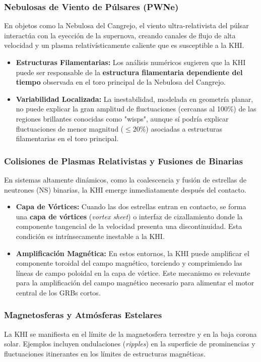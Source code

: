 \subsubsection{Nebulosas de Viento de Púlsares (PWNe)}
En objetos como la Nebulosa del Cangrejo, el viento ultra-relativista del púlsar interactúa con la eyección de la supernova, creando canales de flujo de alta velocidad y un plasma relativísticamente caliente que es susceptible a la KHI.
\begin{itemize}
    \item \textbf{Estructuras Filamentarias:} Los análisis numéricos sugieren que la KHI puede ser responsable de la \textbf{estructura filamentaria dependiente del tiempo} observada en el toro principal de la Nebulosa del Cangrejo.
    \item \textbf{Variabilidad Localizada:} La inestabilidad, modelada en geometría planar, no puede explicar la gran amplitud de fluctuaciones (cercanas al 100\%) de las regiones brillantes conocidas como "wisps", aunque sí podría explicar fluctuaciones de menor magnitud ($\le 20\%$) asociadas a estructuras filamentarias en el toro principal.
\end{itemize}

\subsubsection{Colisiones de Plasmas Relativistas y Fusiones de Binarias}
En sistemas altamente dinámicos, como la coalescencia y fusión de estrellas de neutrones (NS) binarias, la KHI emerge inmediatamente después del contacto.
\begin{itemize}
    \item \textbf{Capa de Vórtices:} Cuando las dos estrellas entran en contacto, se forma una \textbf{capa de vórtices} (\textit{vortex sheet}) o interfaz de cizallamiento donde la componente tangencial de la velocidad presenta una discontinuidad. Esta condición es intrínsecamente inestable a la KHI.
    \item \textbf{Amplificación Magnética:} En estos entornos, la KHI puede amplificar el componente toroidal del campo magnético, torciendo y comprimiendo las líneas de campo poloidal en la capa de vórtice. Este mecanismo es relevante para la amplificación del campo magnético necesario para alimentar el motor central de los GRBs cortos.
\end{itemize}

\subsubsection{Magnetosferas y Atmósferas Estelares}
La KHI se manifiesta en el límite de la magnetosfera terrestre y en la baja corona solar. Ejemplos incluyen ondulaciones (\textit{ripples}) en la superficie de prominencias y fluctuaciones itinerantes en los límites de estructuras magnéticas.

